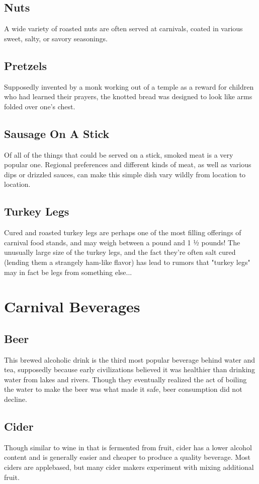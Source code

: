 \documentclass[10pt,a4paper,twoside,twocolumn,openany,bg=print,nodeprecatedcode]{dndbook}
\begin{document}
\subsection{Nuts}
A wide variety of roasted nuts are often served at carnivals, coated in various sweet, salty, or savory seasonings.
\subsection{Pretzels}
Supposedly invented by a monk working out of a temple as a reward for children who had learned their prayers, the knotted bread was designed to look like arms folded over one's chest.
\subsection{Sausage On A Stick}
Of all of the things that could be served on a stick, smoked meat is a very popular one. Regional preferences and different kinds of meat, as well as various dips or drizzled sauces, can make this simple dish vary wildly from location to location.
\subsection{Turkey Legs}
Cured and roasted turkey legs are perhaps one of the most filling offerings of carnival food stands, and may weigh between a pound and 1 ½ pounds! The unusually large size of the turkey legs, and the fact they're often salt cured (lending them a strangely ham-like flavor) has lead to rumors that "turkey legs" may in fact be legs from something else...
\section{Carnival Beverages}
\subsection{Beer}
This brewed alcoholic drink is the third most popular beverage behind water and tea, supposedly because early civilizations believed it was healthier than drinking water from lakes and rivers. Though they eventually realized the act of boiling the water to make the beer was what made it safe, beer consumption did not decline.
\subsection{Cider}
Though similar to wine in that is fermented from fruit, cider has a lower alcohol content and is generally easier and cheaper to produce a quality beverage. Most ciders are applebased, but many cider makers experiment with mixing additional fruit.
\end{document}
